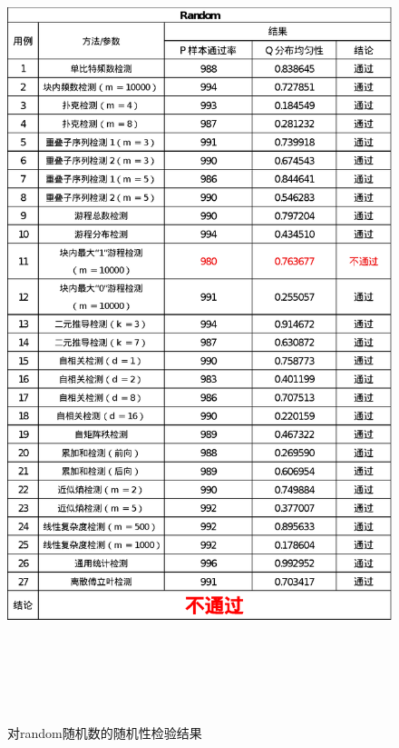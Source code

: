\documentclass[12pt,a4paper]{article}%
\begin{document}
    \begin{figure}
        \centering
        \includegraphics[height=23.7cm]{Random}
        \caption{对random随机数的随机性检验结果}
        \label{fig:fig.3}
        \hypertarget{fig:fig.3}{}

    \end{figure}
\end{document}
